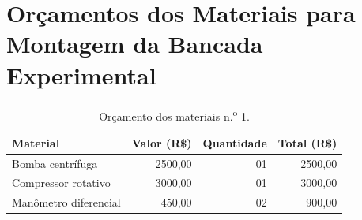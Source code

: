 
\chapter{Orçamentos dos Materiais para Montagem da Bancada Experimental}\label{cap:apendiceb}

\begin{table}[htb]%
\caption{Orçamento dos materiais n.\textsuperscript{o} 1.}%
\label{tab:tab3}%
\begin{tabularx}{\textwidth}{@{\extracolsep{\fill}}lrrr}%
\toprule
Material              & \multicolumn{1}{c}{Valor (R\$)} & \multicolumn{1}{c}{Quantidade}  & \multicolumn{1}{c}{Total (R\$)} \\ \midrule
Bomba centrífuga      & 2500,00                         & 01                              & 2500,00                         \\
Compressor rotativo   & 3000,00                         & 01                              & 3000,00                         \\
Manômetro diferencial & 450,00                          & 02                              & 900,00                          \\

\end{tabularx}
\fonte{}%
\end{table}
